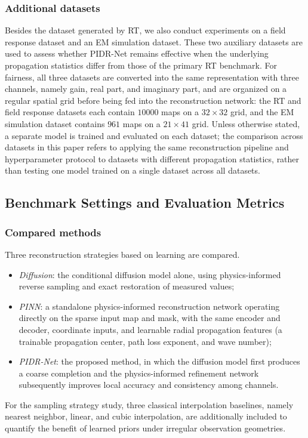 \documentclass[lettersize,journal]{IEEEtran}
\begin{document}
\subsubsection{Additional datasets}
Besides the dataset generated by RT, we also conduct experiments on a field response dataset and an EM simulation dataset. These two auxiliary datasets are used to assess whether PIDR-Net remains effective when the underlying propagation statistics differ from those of the primary RT benchmark. For fairness, all three datasets are converted into the same representation with three channels, namely gain, real part, and imaginary part, and are organized on a regular spatial grid before being fed into the reconstruction network: the RT and field response datasets each contain $10000$ maps on a $32\times 32$ grid, and the EM simulation dataset contains $961$ maps on a $21\times 41$ grid. Unless otherwise stated, a separate model is trained and evaluated on each dataset; the comparison across datasets in this paper refers to applying the same reconstruction pipeline and hyperparameter protocol to datasets with different propagation statistics, rather than testing one model trained on a single dataset across all datasets.

\subsection{Benchmark Settings and Evaluation Metrics}

\subsubsection{Compared methods}
Three reconstruction strategies based on learning are compared.
\begin{itemize}
    \item \textit{Diffusion}: the conditional diffusion model alone, using physics-informed reverse sampling and exact restoration of measured values;
    \item \textit{PINN}: a standalone physics-informed reconstruction network operating directly on the sparse input map and mask, with the same encoder and decoder, coordinate inputs, and learnable radial propagation features (a trainable propagation center, path loss exponent, and wave number);
    \item \textit{PIDR-Net}: the proposed method, in which the diffusion model first produces a coarse completion and the physics-informed refinement network subsequently improves local accuracy and consistency among channels.
\end{itemize}
For the sampling strategy study, three classical interpolation baselines, namely nearest neighbor, linear, and cubic interpolation, are additionally included to quantify the benefit of learned priors under irregular observation geometries.
\end{document}
